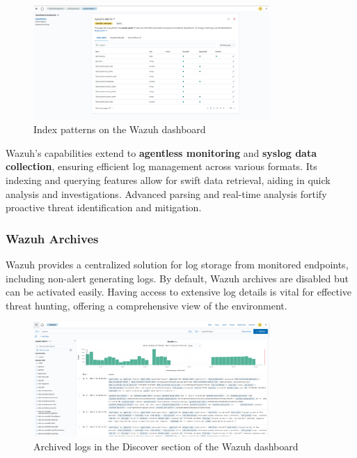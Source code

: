 \begin{figure}[H]
    \centering
    \includegraphics[width=0.8\textwidth]{images/threat-hunting/wazuh-alerts-index-pattern.png}
    \caption{Index patterns on the Wazuh dashboard}
    \label{fig:wazuh-alerts-index-pattern}
\end{figure}

Wazuh's capabilities extend to \textbf{agentless monitoring} and \textbf{syslog data collection}, ensuring efficient log management across various formats. Its indexing and querying features allow for swift data retrieval, aiding in quick analysis and investigations. Advanced parsing and real-time analysis fortify proactive threat identification and mitigation.

\subsubsection{Wazuh Archives}

Wazuh provides a centralized solution for log storage from monitored endpoints, including non-alert generating logs. By default, Wazuh archives are disabled but can be activated easily. Having access to extensive log details is vital for effective threat hunting, offering a comprehensive view of the environment.

\begin{figure}[H]
    \centering
    \includegraphics[width=0.8\textwidth]{images/threat-hunting/discover-archives-logs.png}
    \caption{Archived logs in the Discover section of the Wazuh dashboard}
    \label{fig:discover-archives-logs}
\end{figure}

